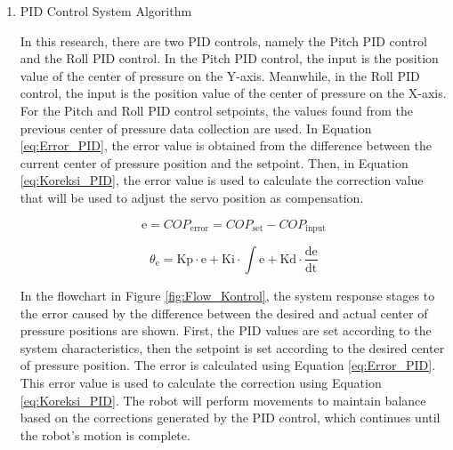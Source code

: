\begin{enumerate}[label=\Alph*.]
    \item PID Control System Algorithm
    \label{subsec:algoritmakontrolpid}

    \hspace*{1em} In this research, there are two PID controls, namely the Pitch PID control and the Roll PID control. In the Pitch PID control, the input is the position value of the center of pressure on the Y-axis. Meanwhile, in the Roll PID control, the input is the position value of the center of pressure on the X-axis. For the Pitch and Roll PID control setpoints, the values found from the previous center of pressure data collection are used. In Equation \ref{eq:Error_PID}, the error value is obtained from the difference between the current center of pressure position and the setpoint. Then, in Equation \ref{eq:Koreksi_PID}, the error value is used to calculate the correction value that will be used to adjust the servo position as compensation.

    \begin{equation}
      \mathrm{e} = COP_{\mathrm{error}} = COP_{\mathrm{set}} - COP_{\mathrm{input}}
      \label{eq:Error_PID}
    \end{equation}

    \begin{equation}
      \theta_\mathrm{e} = \mathrm{Kp} \cdot \mathrm{e} + \mathrm{Ki} \cdot \int \mathrm{e} + \mathrm{Kd} \cdot \frac{\mathrm{de}}{\mathrm{dt}}
      \label{eq:Koreksi_PID}
    \end{equation}
    
    \hspace*{1em} In the flowchart in Figure \ref{fig:Flow_Kontrol}, the system response stages to the error caused by the difference between the desired and actual center of pressure positions are shown. First, the PID values are set according to the system characteristics, then the setpoint is set according to the desired center of pressure position. The error is calculated using Equation \ref{eq:Error_PID}. This error value is used to calculate the correction using Equation \ref{eq:Koreksi_PID}. The robot will perform movements to maintain balance based on the corrections generated by the PID control, which continues until the robot's motion is complete.


\end{enumerate}
